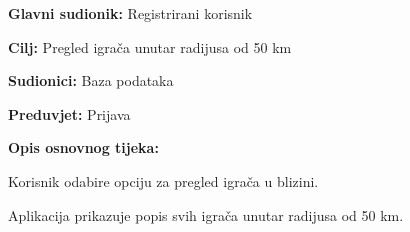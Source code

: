 \noindent {}
\begin{packed_item}
	
	\item \textbf{Glavni sudionik: }Registrirani korisnik
	\item  \textbf{Cilj:} Pregled igrača unutar radijusa od 50 km
	\item  \textbf{Sudionici:} Baza podataka
	\item  \textbf{Preduvjet:} Prijava
	\item  \textbf{Opis osnovnog tijeka:}
	
	\item[] \begin{packed_enum}
		
		\item Korisnik odabire opciju za pregled igrača u blizini.
		\item Aplikacija prikazuje popis svih igrača unutar radijusa od 50 km.
	\end{packed_enum}
\end{packed_item}

